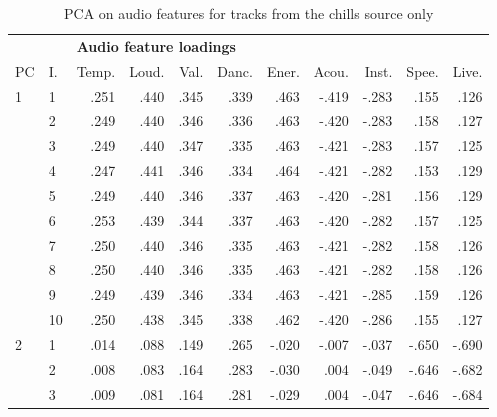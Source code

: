\begin{table}[ht]
\centering
\scriptsize

\begin{threeparttable}
\caption{PCA on audio features for tracks from the chills source only}
\label{tab:val-7}

\begin{tabular*}{\textwidth}{@{\extracolsep{\fill}}llrrrrrrrrr@{}}

\toprule && 
\multicolumn{9}{l}{\textbf{Audio feature loadings}} \\
\cmidrule{3-11}

PC & I. & Temp. & Loud. & Val. & Danc. & Ener. & Acou. & Inst. & Spee. & Live. \\ 
\midrule

1  & 1         & .251  & .440     & .345    & .339   & .463   & -.419   & -.283   & .155    & .126     \\
   & 2         & .249  & .440     & .346    & .336   & .463   & -.420   & -.283   & .158    & .127     \\
   & 3         & .249  & .440     & .347    & .335   & .463   & -.421   & -.283   & .157    & .125     \\
   & 4         & .247  & .441     & .346    & .334   & .464   & -.421   & -.282   & .153    & .129     \\
   & 5         & .249  & .440     & .346    & .337   & .463   & -.420   & -.281   & .156    & .129     \\
   & 6         & .253  & .439     & .344    & .337   & .463   & -.420   & -.282   & .157    & .125     \\
   & 7         & .250  & .440     & .346    & .335   & .463   & -.421   & -.282   & .158    & .126     \\
   & 8         & .250  & .440     & .346    & .335   & .463   & -.421   & -.282   & .158    & .126     \\
   & 9         & .249  & .439     & .346    & .334   & .463   & -.421   & -.285   & .159    & .126     \\
   & 10        & .250  & .438     & .345    & .338   & .462   & -.420   & -.286   & .155    & .127     \\
2  & 1         & .014  & .088     & .149    & .265   & -.020  & -.007   & -.037   & -.650   & -.690    \\
   & 2         & .008  & .083     & .164    & .283   & -.030  & .004    & -.049   & -.646   & -.682    \\
   & 3         & .009  & .081     & .164    & .281   & -.029  & .004    & -.047   & -.646   & -.684    \\

\end{tabular*}
\end{threeparttable}
\end{table}
